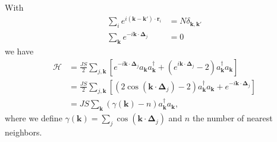 \documentclass[a4paper,12pt]{article}
\begin{document}
		With 
		\begin{align}
			\sum_{i}e^{i(\mathbf{k}-\mathbf{k}')\cdot\mathbf{r}_i}&=N\delta_{\mathbf{k},\mathbf{k}'}\\
			\sum_{\mathbf{k}}e^{-i\mathbf{k}\cdot\mathbf{\Delta}_j}&=0
		\end{align}
		we have 
		\begin{align}
			\mathcal{H}&=\frac{JS}{2}\sum_{j,\mathbf{k}}\left[e^{-i\mathbf{k}\cdot\mathbf{\Delta}_j}a_\mathbf{k}a^\dagger_{\mathbf{k}}+\left(e^{i\mathbf{k}\cdot\mathbf{\Delta}_j}-2\right)a_\mathbf{k}^\dagger a_{\mathbf{k}}\nonumber\right]\\
			&=\frac{JS}{2}\sum_{j,\mathbf{k}}\left[\left(2\cos(\mathbf{k}\cdot\mathbf{\Delta}_j)-2\right)a_\mathbf{k}^\dagger a_{\mathbf{k}}+e^{-i\mathbf{k}\cdot\mathbf{\Delta}_j}\right]\nonumber\\
			&=JS\sum_{\mathbf{k}}(\gamma(\mathbf{k})-n)a_\mathbf{k}^\dagger a_{\mathbf{k}},\label{equ:ferro_dispersion}
		\end{align}
		where we define $\gamma(\mathbf{k})=\sum_{j}\cos(\mathbf{k}\cdot\mathbf{\Delta}_j)$ and $n$ the number of nearest neighbors.
		
\end{document}
